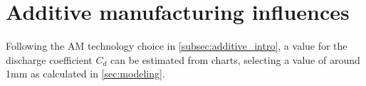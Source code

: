 \section{Additive manufacturing influences}
\label{sec:additive}

Following the AM technology choice in \autoref{subsec:additive_intro}, a value for the discharge coefficient $C_d$ can be estimated from charts, selecting a value of around 1mm as calculated in \autoref{sec:modeling}. 

